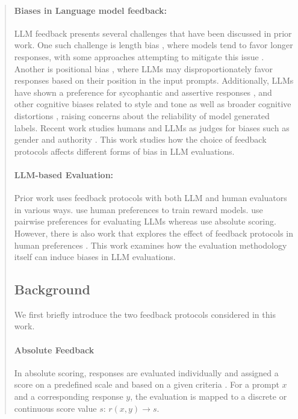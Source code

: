 \documentclass{article}
\begin{document}
\begin{abstract}
\paragraph{Biases in Language model feedback:}
LLM feedback presents several challenges that have been discussed in prior work. One such challenge is length bias \citep{singhal2023long}, where models tend to favor longer responses, with some approaches attempting to mitigate this issue \citep{park2024disentanglinglengthqualitydirect, dubois2024lengthcontrolledalpacaevalsimpleway}. Another is positional bias \citep{wang2023large}, where LLMs may disproportionately favor responses based on their position in the input prompts. Additionally, LLMs have shown a preference for sycophantic \citep{sharma2023understandingsycophancylanguagemodels}  and assertive responses  \citep{hosking2024humanfeedbackgoldstandard}, and other cognitive biases related to style and tone \citep{wu2023style} as well as broader cognitive distortions \citep{koo2023benchmarking}, raising concerns about the reliability of model generated labels. Recent work studies humans and LLMs as judges for biases such as gender and authority \citep{chen-etal-2024-humans}. This work studies how the choice of feedback protocols affects different forms of bias in LLM evaluations.

\paragraph{LLM-based Evaluation:} Prior work uses feedback protocols with both LLM and human evaluators in various ways. \cite{ouyang2022traininglanguagemodelsfollow, stiennon2022learning} use human preferences to train reward models. \cite{Zheng2023JudgingLW} use pairwise preferences for evaluating LLMs whereas \cite{ye2024flaskfinegrainedlanguagemodel} use absolute scoring. However, there is also work that explores the effect of feedback protocols in human preferences \citep{bansal2024peeringpreferencesunravelingfeedback}. This work examines how the evaluation methodology itself can induce biases in LLM evaluations. 

\subsection{Background}

We first briefly introduce the two feedback protocols considered in this work.

\paragraph{Absolute Feedback}
In absolute scoring, responses are evaluated individually and assigned a score on a predefined scale and based on a given criteria \citep{kim2024prometheusinducingfinegrainedevaluation, lee2023rlaif}. For a prompt $x$ and a corresponding response $y$, the evaluation is mapped to a discrete or continuous score value \(s\): \(r(x,y) \rightarrow s\).


\end{abstract}
\end{document}
